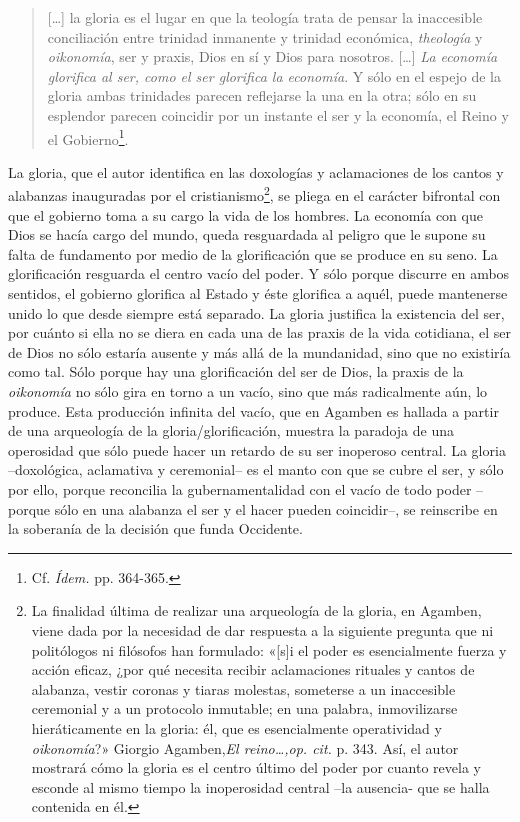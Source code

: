 \begin{quote}
{[}\ldots{]} la gloria es el lugar en que la teología trata de pensar la inaccesible conciliación entre trinidad inmanente y trinidad económica, \emph{theología} y \emph{oikonomía}, ser y praxis, Dios en sí y Dios para nosotros. {[}\ldots{]} \emph{La economía glorifica al ser, como el ser glorifica la economía}. Y sólo en el espejo de la gloria ambas trinidades parecen reflejarse la una en la otra; sólo en su esplendor parecen coincidir por un instante el ser y la economía, el Reino y el Gobierno\footnote{Cf. \emph{Ídem.} pp. 364-365.}.
\end{quote}

La gloria, que el autor identifica en las doxologías y aclamaciones de los cantos y alabanzas inauguradas por el cristianismo\footnote{La finalidad última de realizar una arqueología de la gloria, en Agamben, viene dada por la necesidad de dar respuesta a la siguiente pregunta que ni politólogos ni filósofos han formulado: «{[}s{]}i el poder es esencialmente fuerza y acción eficaz, ¿por qué necesita recibir aclamaciones rituales y cantos de alabanza, vestir coronas y tiaras molestas, someterse a un inaccesible ceremonial y a un protocolo inmutable; en una palabra, inmovilizarse hieráticamente en la gloria: él, que es esencialmente operatividad y \emph{oikonomía}?» Giorgio Agamben,\emph{El reino\ldots,op. cit.} p. 343. Así, el autor mostrará cómo la gloria es el centro último del poder por cuanto revela y esconde al mismo tiempo la inoperosidad central --la ausencia- que se halla contenida en él.}, se pliega en el carácter bifrontal con que el gobierno toma a su cargo la vida de los hombres. La economía con que Dios se hacía cargo del mundo, queda resguardada al peligro que le supone su falta de fundamento por medio de la glorificación que se produce en su seno. La glorificación resguarda el centro vacío del poder. Y sólo porque discurre en ambos sentidos, el gobierno glorifica al Estado y éste glorifica a aquél, puede mantenerse unido lo que desde siempre está separado. La gloria justifica la existencia del ser, por cuánto si ella no se diera en cada una de las praxis de la vida cotidiana, el ser de Dios no sólo estaría ausente y más allá de la mundanidad, sino que no existiría como tal. Sólo porque hay una glorificación del ser de Dios, la praxis de la \emph{oikonomía} no sólo gira en torno a un vacío, sino que más radicalmente aún, lo produce. Esta producción infinita del vacío, que en Agamben es hallada a partir de una arqueología de la gloria/glorificación, muestra la paradoja de una operosidad que sólo puede hacer un retardo de su ser inoperoso central. La gloria --doxológica, aclamativa y ceremonial-- es el manto con que se cubre el ser, y sólo por ello, porque reconcilia la gubernamentalidad con el vacío de todo poder --porque sólo en una alabanza el ser y el hacer pueden coincidir--, se reinscribe en la soberanía de la decisión que funda Occidente.


